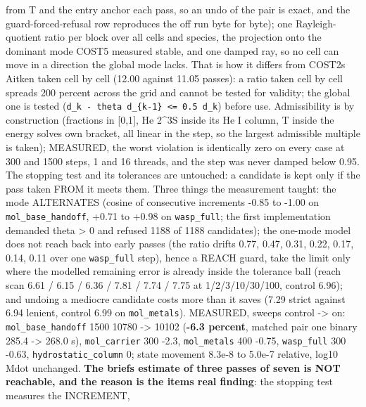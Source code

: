 \documentclass[english,a4paper]{my_memo}
\begin{document}
\begin{itemize}
  from T and the entry anchor each pass, so an undo of the pair is exact,
  and the guard-forced-refusal row reproduces the off run byte for byte);
  one Rayleigh-quotient ratio per block over all cells and species, the
  projection onto the dominant mode COST5 measured stable, and one damped
  ray, so no cell can move in a direction the global mode lacks. That is how
  it differs from COST2\textquotesingle s Aitken taken cell by cell (12.00 against 11.05 passes): a
  ratio taken cell by cell spreads 200 percent across the grid and cannot be
  tested for validity; the global one is tested (\texttt{\textbar{}\textbar{}d\_k\ -\ theta\ d\_\{k-1\}\textbar{}\textbar{}\ \textless{}=\ 0.5\ \textbar{}\textbar{}d\_k\textbar{}\textbar{}}) before use. Admissibility is by construction (fractions in
  {[}0,1{]}, He 2\^{}3S inside its He I column, T inside the energy solve\textquotesingle s own
  bracket, all linear in the step, so the largest admissible multiple is
  taken); MEASURED, the worst violation is identically zero on every case at
  300 and 1500 steps, 1 and 16 threads, and the step was never damped below
  0.95. The stopping test and its tolerances are untouched: a candidate is
  kept only if the pass taken FROM it meets them. Three things the
  measurement taught: the mode ALTERNATES (cosine of consecutive increments
  -0.85 to -1.00 on \texttt{mol\_base\_handoff}, +0.71 to +0.98 on \texttt{wasp\_full}; the
  first implementation demanded theta \textgreater{} 0 and refused 1188 of 1188
  candidates); the one-mode model does not reach back into early passes
  (the ratio drifts 0.77, 0.47, 0.31, 0.22, 0.17, 0.14, 0.11 over one
  \texttt{wasp\_full} step), hence a REACH guard, take the limit only where the
  modelled remaining error is already inside the tolerance ball (reach scan
  6.61 / 6.15 / 6.36 / 7.81 / 7.74 / 7.75 at 1/2/3/10/30/100, control 6.96);
  and undoing a mediocre candidate costs more than it saves (7.29 strict
  against 6.94 lenient, control 6.99 on \texttt{mol\_metals}). MEASURED, sweeps
  control -\textgreater{} on: \texttt{mol\_base\_handoff} 1500 10780 -\textgreater{} 10102 (\textbf{-6.3 percent},
  matched pair one binary 285.4 -\textgreater{} 268.0 s), \texttt{mol\_carrier} 300 -2.3,
  \texttt{mol\_metals} 400 -0.75, \texttt{wasp\_full} 300 -0.63, \texttt{hydrostatic\_column} 0;
  state movement 8.3e-8 to 5.0e-7 relative, log10 Mdot unchanged. \textbf{The
  brief\textquotesingle s estimate of three passes of seven is NOT reachable, and the reason
  is the item\textquotesingle s real finding}: the stopping test measures the INCREMENT,

\end{itemize}
\end{document}
